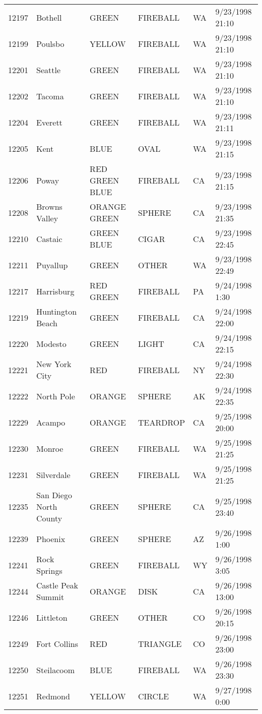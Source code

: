 \begin{tabular}{llllll}
12197 & Bothell & GREEN & FIREBALL & WA & 9/23/1998 21:10 \\
12199 & Poulsbo & YELLOW & FIREBALL & WA & 9/23/1998 21:10 \\
12201 & Seattle & GREEN & FIREBALL & WA & 9/23/1998 21:10 \\
12202 & Tacoma & GREEN & FIREBALL & WA & 9/23/1998 21:10 \\
12204 & Everett & GREEN & FIREBALL & WA & 9/23/1998 21:11 \\
12205 & Kent & BLUE & OVAL & WA & 9/23/1998 21:15 \\
12206 & Poway & RED GREEN BLUE & FIREBALL & CA & 9/23/1998 21:15 \\
12208 & Browns Valley & ORANGE GREEN & SPHERE & CA & 9/23/1998 21:35 \\
12210 & Castaic & GREEN BLUE & CIGAR & CA & 9/23/1998 22:45 \\
12211 & Puyallup & GREEN & OTHER & WA & 9/23/1998 22:49 \\
12217 & Harrisburg & RED GREEN & FIREBALL & PA & 9/24/1998 1:30 \\
12219 & Huntington Beach & GREEN & FIREBALL & CA & 9/24/1998 22:00 \\
12220 & Modesto & GREEN & LIGHT & CA & 9/24/1998 22:15 \\
12221 & New York City & RED & FIREBALL & NY & 9/24/1998 22:30 \\
12222 & North Pole & ORANGE & SPHERE & AK & 9/24/1998 22:35 \\
12229 & Acampo & ORANGE & TEARDROP & CA & 9/25/1998 20:00 \\
12230 & Monroe & GREEN & FIREBALL & WA & 9/25/1998 21:25 \\
12231 & Silverdale & GREEN & FIREBALL & WA & 9/25/1998 21:25 \\
12235 & San Diego North County & GREEN & SPHERE & CA & 9/25/1998 23:40 \\
12239 & Phoenix & GREEN & SPHERE & AZ & 9/26/1998 1:00 \\
12241 & Rock Springs & GREEN & FIREBALL & WY & 9/26/1998 3:05 \\
12244 & Castle Peak Summit & ORANGE & DISK & CA & 9/26/1998 13:00 \\
12246 & Littleton & GREEN & OTHER & CO & 9/26/1998 20:15 \\
12249 & Fort Collins & RED & TRIANGLE & CO & 9/26/1998 23:00 \\
12250 & Steilacoom & BLUE & FIREBALL & WA & 9/26/1998 23:30 \\
12251 & Redmond & YELLOW & CIRCLE & WA & 9/27/1998 0:00 \\

\end{tabular}
